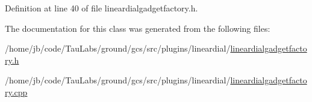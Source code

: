 \-Definition at line 40 of file lineardialgadgetfactory.\-h.



\-The documentation for this class was generated from the following files\-:\begin{DoxyCompactItemize}
\item 
/home/jb/code/\-Tau\-Labs/ground/gcs/src/plugins/lineardial/\hyperlink{lineardialgadgetfactory_8h}{lineardialgadgetfactory.\-h}\item 
/home/jb/code/\-Tau\-Labs/ground/gcs/src/plugins/lineardial/\hyperlink{lineardialgadgetfactory_8cpp}{lineardialgadgetfactory.\-cpp}\end{DoxyCompactItemize}
